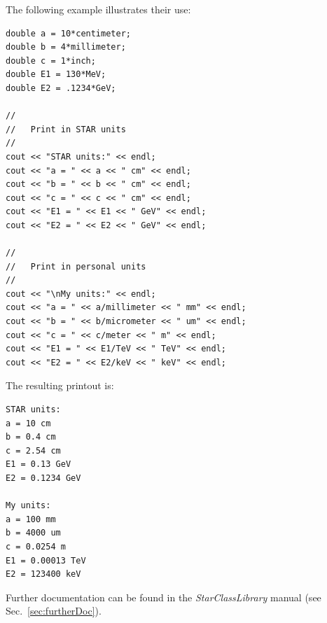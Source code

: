 \documentclass[twoside]{article}
\newcommand{\name}[1]{\textsl{#1}}%
\begin{document}
The following example illustrates their use:
\begin{verbatim}
double a = 10*centimeter;
double b = 4*millimeter;
double c = 1*inch;
double E1 = 130*MeV;
double E2 = .1234*GeV;

//
//   Print in STAR units
//
cout << "STAR units:" << endl;
cout << "a = " << a << " cm" << endl;
cout << "b = " << b << " cm" << endl;
cout << "c = " << c << " cm" << endl;
cout << "E1 = " << E1 << " GeV" << endl;
cout << "E2 = " << E2 << " GeV" << endl;

//
//   Print in personal units
//
cout << "\nMy units:" << endl;
cout << "a = " << a/millimeter << " mm" << endl;
cout << "b = " << b/micrometer << " um" << endl;
cout << "c = " << c/meter << " m" << endl;
cout << "E1 = " << E1/TeV << " TeV" << endl;
cout << "E2 = " << E2/keV << " keV" << endl;
\end{verbatim}
The resulting printout is:
\begin{verbatim}
STAR units:
a = 10 cm
b = 0.4 cm
c = 2.54 cm
E1 = 0.13 GeV
E2 = 0.1234 GeV

My units:
a = 100 mm
b = 4000 um
c = 0.0254 m
E1 = 0.00013 TeV
E2 = 123400 keV
\end{verbatim}
Further documentation can be found in the \name{StarClassLibrary}
manual (see Sec.~\ref{sec:furtherDoc}).\vfill
\end{document}
